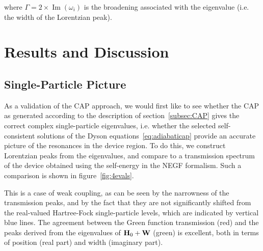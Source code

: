 where $\Gamma = 2 \times \operatorname{Im}(\omega_i)$ is the broadening
associated with the eigenvalue (i.e. the width of the Lorentzian peak).

\section{Results and Discussion}
\label{sec:results}

\subsection{Single-Particle Picture}
\label{subsec:SingleParticle}

As a validation of the \ac{CAP} approach, we would first like to see whether
the \ac{CAP} as generated according to the description of
section~\ref{subsec:CAP} gives the correct complex single-particle eigenvalues,
i.e. whether the selected self-consistent solutions of the Dyson
equations~\ref{eq:adiabaticap} provide an accurate picture of the resonances
in the device region. To do this, we construct Lorentzian peaks from the
eigenvalues, and compare to a transmission spectrum of the device obtained
using the self-energy in the \ac{NEGF} formalism. Such a comparison is shown in
figure~\ref{fig:4evals}.

This is a case of weak coupling, as can be seen by the narrowness of the
transmission peaks, and by the fact that they are not significantly shifted
from the real-valued Hartree-Fock single-particle levels, which are indicated
by vertical blue lines. The agreement between the Green function transmission
(red) and the peaks derived from the eigenvalues of $\mathbf{H}_0 + \mathbf{W}$ (green)
is excellent, both in terms of position (real part) and width (imaginary part).

